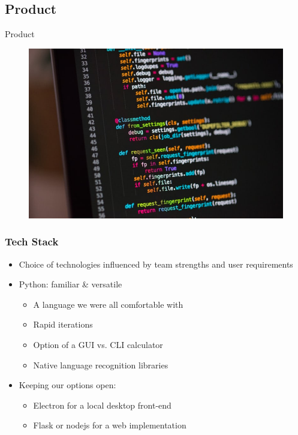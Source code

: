 \documentclass{beamer}
\begin{document}
\begin{frame}
\section{Product}
\begin{center}
{\Huge Product}
\begin{figure}
\includegraphics[scale=0.3]{Product}\footnotemark[4]
\end{figure}
\end{center}
\end{frame}

\begin{frame}
\frametitle{Tech Stack}
 \begin{itemize}
  \item Choice of technologies influenced by team strengths and user requirements
  \item Python: familiar \& versatile
   \begin{itemize}
    \item A language we were all comfortable with
    \item Rapid iterations
    \item Option of a GUI vs. CLI calculator
    \item Native language recognition libraries
   \end{itemize}
  \item Keeping our options open:
   \begin{itemize}
    \item Electron for a local desktop front-end
    \item Flask or nodejs for a web implementation
   \end{itemize}
  \end{itemize}
\end{frame}
\end{document}
